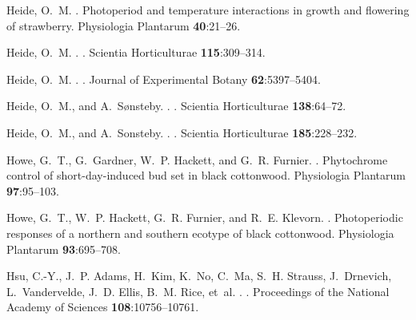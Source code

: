\documentclass{article}
\begin{document}
\begin{thebibliography}{131}
Heide, O.~M.
.
\newblock Photoperiod and temperature interactions in growth and flowering of
  strawberry.
\newblock Physiologia Plantarum {\bf 40}:21--26.

Heide, O.~M.
.
.
\newblock Scientia Horticulturae {\bf 115}:309--314.

Heide, O.~M.
.
.
\newblock Journal of Experimental Botany {\bf 62}:5397--5404.

Heide, O.~M., and A.~S{\o}nsteby.
.
.
\newblock Scientia Horticulturae {\bf 138}:64--72.

Heide, O.~M., and A.~Sonsteby.
.
.
\newblock Scientia Horticulturae {\bf 185}:228--232.

Howe, G.~T., G.~Gardner, W.~P. Hackett, and G.~R. Furnier.
.
\newblock Phytochrome control of short-day-induced bud set in black cottonwood.
\newblock Physiologia Plantarum {\bf 97}:95--103.

Howe, G.~T., W.~P. Hackett, G.~R. Furnier, and R.~E. Klevorn.
.
\newblock Photoperiodic responses of a northern and southern ecotype of black
  cottonwood.
\newblock Physiologia Plantarum {\bf 93}:695--708.

Hsu, C.-Y., J.~P. Adams, H.~Kim, K.~No, C.~Ma, S.~H. Strauss, J.~Drnevich,
  L.~Vandervelde, J.~D. Ellis, B.~M. Rice, et~al.
.
.
\newblock Proceedings of the National Academy of Sciences {\bf
  108}:10756--10761.


\end{thebibliography}
\end{document}
